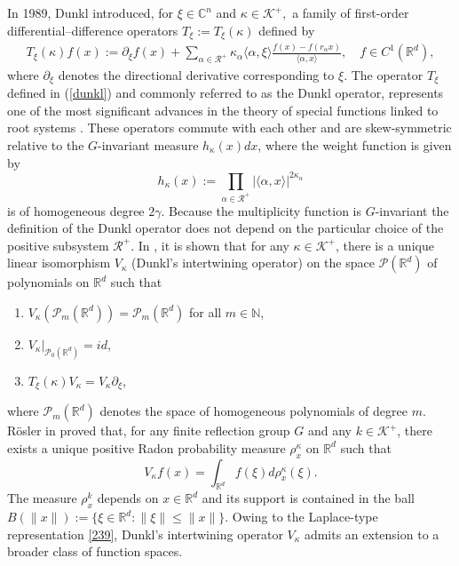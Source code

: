 \documentclass[a4paper,11pt, reqno]{amsart}
\theoremstyle{definition}
\theoremstyle{remark}
\numberwithin{equation}{section}
\begin{document}
	In 1989, Dunkl introduced, for $\xi \in \mathbb{C}^{n}$ and $\kappa \in \mathcal{K}^{+},$ a family of first-order differential–difference operators $T_{\xi}:= T_{\xi}(\kappa)$ defined by
	\begin{align}\label{dunkl}
		T_{\xi}(\kappa) f(x):=\partial_{\xi} f(x)+\sum_{\alpha \in \mathcal{R}^{+}} \kappa_{\alpha }\langle \alpha, \xi\rangle \frac{f(x)-f\left(r_{\alpha} x\right)}{\langle \alpha, x\rangle}, \quad f \in C^{1}\left(\mathbb{R}^{d}\right),
	\end{align}
	where $\partial_{\xi}$ denotes the directional derivative corresponding to $\xi$.  The operator $T_\xi$   defined in (\ref{dunkl}) and commonly referred to as the Dunkl operator, represents one of the most significant advances in the theory of special functions linked to root systems \cite{dun}. These operators commute with each other and are skew-symmetric relative to the $G$-invariant measure $h_{\kappa}(x)dx$, where the weight function is given by $$h_{\kappa}(x):=\prod\limits_{\alpha\in \mathcal{R}^{+}}|\langle \alpha, x\rangle|^{2 \kappa_{\alpha}}$$ is of homogeneous degree $2\gamma$. Because the multiplicity function is $G$-invariant  the definition of the Dunkl operator does not depend on the particular choice of the positive subsystem  $\mathcal{R}^{+}$.  In \cite{dun1991}, it is shown that for any $\kappa\in\mathcal{K}^+$, there is a unique linear isomorphism $V_\kappa$ (Dunkl's intertwining operator) on the space $\mathcal{P}(\mathbb{R}^{d})$ of polynomials on $\mathbb{R}^{d}$ such that
	\begin{enumerate}
		\item $V_\kappa\left(\mathcal{P}_m(\mathbb{R}^{d})\right)=\mathcal{P}_m(\mathbb{R}^{d})$ for all $m\in\mathbb{N}$,
		\item $V_\kappa|_{\mathcal{P}_0(\mathbb{R}^{d})}=id$,
		\item $T_\xi(\kappa)V_\kappa=V_\kappa\partial_\xi$,
	\end{enumerate}
	where  $\mathcal{P}_m(\mathbb{R}^{d})$ denotes the space of homogeneous polynomials of degree $m$. R\"{o}sler in \cite{ros} proved that, for any finite reflection group $G$ and   any $k\in\mathcal{K}^+$,   there exists a unique positive Radon probability measure $\rho_x^\kappa$ on $\mathbb{R}^{d}$ such that
	\begin{equation}\label{239}	
    V_\kappa f(x)=\int_{\mathbb{R}^{d}}f(\xi)d\rho_x^\kappa(\xi).
	\end{equation}
The measure $\rho_x^k$ depends on $x\in\mathbb{R}^{d}$ and its support is contained in the ball $B\left(\|x\|\right):=\{\xi\in\mathbb{R}^{d}: \|\xi\|\leq\|x\|\}$. Owing to the Laplace-type representation \eqref{239}, Dunkl’s intertwining operator  $V_\kappa$ admits an extension to a broader class of function spaces.
	
\end{document}
